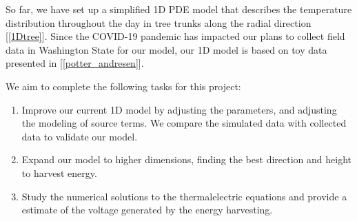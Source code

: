 \documentclass[12pt]{article}
\begin{document}


So far, we have set up a simplified 1D PDE model that describes the temperature distribution throughout the day in tree trunks along the radial direction [\ref{1Dtree}]. Since the COVID-19 pandemic has impacted our plans to collect field data in Washington State for our model, our 1D model is based on toy data presented in [\ref{potter_andresen}]. 

We aim to complete the following tasks for this project:
\begin{enumerate}
\item Improve our current 1D model by adjusting the parameters, and adjusting the modeling of source terms. We compare the simulated data with collected data to validate our model.
\item Expand our model to higher dimensions, finding the best direction and height to harvest energy. 
\item Study the numerical solutions to the thermalelectric equations and provide a estimate of the voltage generated by the energy harvesting. 
\end{enumerate}


\end{document}
